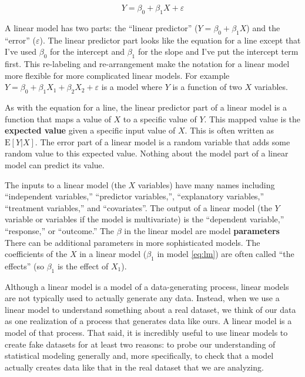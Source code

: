 \documentclass[]{book}
\theoremstyle{definition}
\theoremstyle{definition}
\theoremstyle{definition}
\theoremstyle{remark}
\begin{document}
\begin{equation}
Y = \beta_0 + \beta_1 X + \varepsilon
\label{eq:lm}
\end{equation}

A linear model has two parts: the ``linear predictor''
(\(Y = \beta_0 + \beta_1 X\)) and the ``error'' (\(\varepsilon\)). The
linear predictor part looks like the equation for a line except that
I've used \(\beta_0\) for the intercept and \(\beta_1\) for the slope
and I've put the intercept term first. This re-labeling and
re-arrangement make the notation for a linear model more flexible for
more complicated linear models. For example
\(Y = \beta_0 + \beta_1 X_1 + \beta_2 X_2 + \varepsilon\) is a model
where \(Y\) is a function of two \(X\) variables.

As with the equation for a line, the linear predictor part of a linear
model is a function that maps a value of \(X\) to a specific value of
\(Y\). This mapped value is the \textbf{expected value} given a specific
input value of \(X\). This is often written as \(\mathrm{E}[Y|X]\). The
error part of a linear model is a random variable that adds some random
value to this expected value. Nothing about the model part of a linear
model can predict its value.

The inputs to a linear model (the \(X\) variables) have many names
including ``independent variables,'' ``predictor variables,'',
``explanatory variables,'' ``treatment variables,'' and ``covariates''.
The output of a linear model (the \(Y\) variable or variables if the
model is multivariate) is the ``dependent variable,'' ``response,'' or
``outcome.'' The \(\beta\) in the linear model are model
\textbf{parameters} There can be additional parameters in more
sophisticated models. The coefficients of the \(X\) in a linear model
(\(\beta_1\) in model \eqref{eq:lm}) are often called ``the effects'' (so
\(\beta_1\) is the effect of \(X_1\)).

Although a linear model is a model of a data-generating process, linear
models are not typically used to actually generate any data. Instead,
when we use a linear model to understand something about a real dataset,
we think of our data as one realization of a process that generates data
like ours. A linear model is a model of that process. That said, it is
incredibly useful to use linear models to create fake datasets for at
least two reasons: to probe our understanding of statistical modeling
generally and, more specifically, to check that a model actually creates
data like that in the real dataset that we are analyzing.
\end{document}
